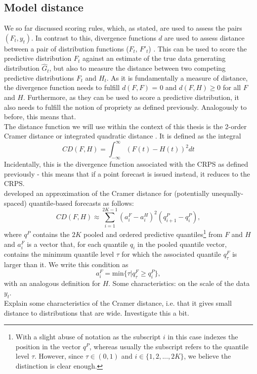 \subsection{Model distance}
We so far discussed scoring rules, which, as stated, are used to assess the pairs $(F_t, y_t)$. In contrast to this, divergence functions $d$ are used to assess distance between a pair of distribution functions ($F_t$, $F'_t$) \citep{thorarinsdottir_using_2013}. This can be used to score the predictive distribution $F_t$ against an estimate of the true data generating distribution $\hat{G}_t$, but also to measure the distance between two competing predictive distributions $F_t$ and $H_t$. As it is fundamentally a measure of distance, the divergence function needs to fulfill $d(F,F)$ = 0 and $d(F,H)\geq 0$ for all $F$ and $H$. Furthermore, as they can be used to score a predictive distribution, it also needs to fulfill the notion of propriety as defined previously. Analogously to before, this means that. \\
The distance function we will use within the context of this thesis is the 2-order Cramer distance or integrated quadratic distance \cite{thorarinsdottir_using_2013}. It is defined as the integral
\begin{equation}
CD(F, H) = \int_{-\infty}^{\infty}\left(F(t) - H(t) \right)^2dt
\end{equation}
Incidentally, this is the divergence function associated with the CRPS as defined previously - this means that if a point forecast is issued instead, it reduces to the CRPS.\\
\cite{wang_covidhubutils_2022} developed an approximation of the Cramer distance for (potentially unequally-spaced) quantile-based forecasts as follows:
\begin{equation}
CD(F,H) \approx \sum_{i = 1}^{2K-1} (a_i^F - a_i^H)^2 (q_{i+1}^{P} - q_{i}^{P}),
\end{equation} 
where $q^P$ contains the $2K$ pooled and ordered predictive quantiles\footnote{With a slight abuse of notation as the subscript $i$ in this case indexes the position in the vector $q^P$, whereas usually the subscript refers to the quantile level $\tau$. However, since $\tau \in (0,1)$ and $i \in \{1,2,...,2K\}$, we believe the distinction is clear enough.} from $F$ and $H$ and $a_i^F$ is a vector that, for each quantile $q_i$ in the pooled quantile vector, contains the minimum quantile level $\tau$ for which the associated quantile $q_\tau^F$ is larger than it. We write this condition as
\begin{equation*}
a_i^F = \text{min}\{\tau | q_\tau^F \geq q_i^P\},
\end{equation*}
with an analogous definition for $H$.
Some characteristics: on the scale of the data $y_t$.\\
Explain some characteristics of the Cramer distance, i.e. that it gives small distance to distributions that are wide. Investigate this a bit.
